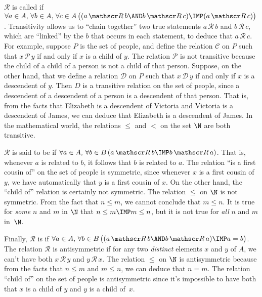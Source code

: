 $\mathscr R$ is called  if
$\forall a\in A,\,\forall b\in A,\,\forall c\in A\,
\big((a\,{\mathscr R}\,b \AND b\,{\mathscr R}\,c)\IMP (a\,{\mathscr R}\,c)\big)$.
Transitivity allows us to ``chain together'' two true
statements $a\,{\mathscr R}\,b$ and $b\,{\mathscr R}\,c$,
which are ``linked'' by the $b$ that occurs in each statement, to
deduce that $a\,{\mathscr R}\,c$.  For example, suppose
$P$ is the set of people, and define the relation ${\mathscr C}$
on $P$ such that $x\,{\mathscr P}\,y$ if and only if $x$ is a
child of $y$.  The relation ${\mathscr P}$ is not transitive
because the child of a child of a person is not a child of
that person.  Suppose, on the other hand, that we define
a relation ${\mathscr D}$ on $P$ such that $x\,{\mathscr D}\,y$
if and only if $x$ is a descendent of $y$.  Then $D$ is a
transitive relation on the set of people, since a descendent of
a descendent of a person is a descendent of that person.
That is, from the facts that Elizabeth is a descendent of Victoria
and Victoria is a descendent of James, we can deduce that
Elizabeth is a descendent of James.  In the mathematical world,
the relations $\le$ and $<$ on the set $\N$ are both transitive.

${\mathscr R}$ is said to be  if 
$\forall a\in A,\,\forall b\in B\, (a\,{\mathscr R}\,b\IMP b\,{\mathscr R}\,a)$.
That is, whenever $a$ is related to $b$, it follows that $b$ is related to $a$.
The relation ``is a first cousin of'' on the set of people is
symmetric, since whenever $x$ is a first cousin of $y$, we have
automatically that $y$ is a first cousin of $x$.  On the other hand,
the ``child of'' relation is certainly not symmetric.  The relation
$\le$ on $\N$ is not symmetric.  From the fact that $n\le m$,
we cannot conclude that $m\le n$.  It is true for \emph{some}
$n$ and $m$ in $\N$ that $n\le m\IMP m\le n$, but it is not true
for \emph{all} $n$ and $m$ in~$\N$.

Finally, $\mathscr R$ is 
if $\forall a\in A,\,\forall b\in B\, \big((a\,{\mathscr R}\,b\AND b\,{\mathscr R}\,a)\IMP a=b\big)$.
The relation $\mathscr R$ is antisymmetric if for any two
\emph{distinct} elements $x$ and $y$ of $A$, we can't have both
$x\,{\mathscr R}\,y$ and $y\,{\mathscr R}\,x$.  The relation
$\le$ on $\N$ is antisymmetric because from the facts that
$n\le m$ and $m\le n$, we can deduce that $n=m$.  The relation
``child of'' on the set of people is antisymmetric since 
it's impossible to have both that $x$ is a child of $y$ and
$y$ is a child of~$x$.

